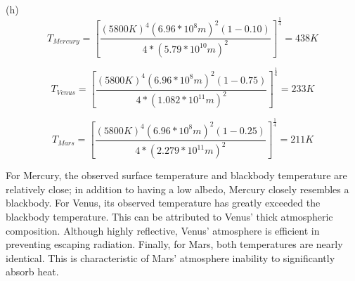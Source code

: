 \documentclass{homework}
\begin{document}
(h)
\begin{equation*}
    T_{Mercury} =\left[ \frac{(5800K)^4(6.96*10^8 m)^2 (1-0.10)}{4*(5.79*10^{10} m)^2}         \right]^\frac{1}{4} = 438 K 
\end{equation*}

\begin{equation*}
    T_{Venus} =\left[ \frac{(5800K)^4(6.96*10^8 m)^2 (1-0.75)}{4*(1.082*10^{11} m)^2}
    \right]^\frac{1}{4} = 233 K 
\end{equation*}

\begin{equation*}
    T_{Mars} =\left[ \frac{(5800K)^4(6.96*10^8 m)^2 (1-0.25)}{4*(2.279*10^{11} m)^2}         
    \right]^\frac{1}{4} = 211 K
\end{equation*}

For Mercury, the observed surface temperature and blackbody temperature are relatively close; in addition to having a low albedo, Mercury closely resembles a blackbody. For Venus, its observed temperature has greatly exceeded the blackbody temperature. This can be attributed to Venus' thick atmospheric composition. Although highly reflective, Venus' atmosphere is efficient in preventing escaping radiation. Finally, for Mars, both temperatures are nearly identical. This is characteristic of Mars' atmosphere inability to significantly absorb heat.
\end{document}
